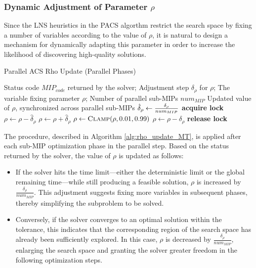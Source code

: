 \subsubsection{Dynamic Adjustment of Parameter $\rho$}
Since the LNS heuristics in the PACS algorthm restrict the search space by fixing a number of variables according to the value of $\rho$, it is natural to design a mechanism for dynamically adapting this parameter in order to increase the likelihood of discovering high-quality solutions.  
\begin{algorithm}[H]
\caption{Parallel ACS Rho Update (Parallel Phases)}\label{alg:rho_update_MT}
\begin{algorithmic}[1]
\Require Status code $MIP_{code}$ returned by the solver; Adjustment step $\delta_\rho$ for $\rho$; The variable fixing parameter $\rho$; Number of parallel sub-MIPs $num_{MIP}$
\Ensure Updated value of $\rho$, synchronized across parallel sub-MIPs
    \State $\hat\delta_\rho \gets {\delta_\rho \over{num_{MIP}}}$
    \State \textbf{acquire lock}
        \State $\rho \gets \rho - \hat\delta_\rho$
    \EndIf
        \State $\rho \gets \rho + \hat\delta_\rho$
    \EndIf
    \State $\rho \gets \Call{Clamp}{\rho,0.01,0.99}$
        \State $\rho \gets \rho - \delta_\rho$
    \EndIf
    \State \textbf{release lock}
\EndFunction
\end{algorithmic}
\end{algorithm}
The procedure, described in Algorithm \ref{alg:rho_update_MT}, is applied after each sub-MIP optimization phase in the parallel step. Based on the status returned by the solver, the value of $\rho$ is updated as follows:
\begin{itemize}
    \item  If the solver hits the time limit—either the deterministic limit or the global remaining time—while still producing a feasible solution, $\rho$ is increased by $\frac{\delta_\rho}{num_{MIP}}$. This adjustment suggests fixing more variables in subsequent phases, thereby simplifying the subproblem to be solved. 
    \item Conversely, if the solver converges to an optimal solution within the tolerance, this indicates that the corresponding region of the search space has already been sufficiently explored. In this case, $\rho$ is decreased by $\frac{\delta_\rho}{num_{MIP}}$, enlarging the search space and granting the solver greater freedom in the following optimization steps.  
\end{itemize}
